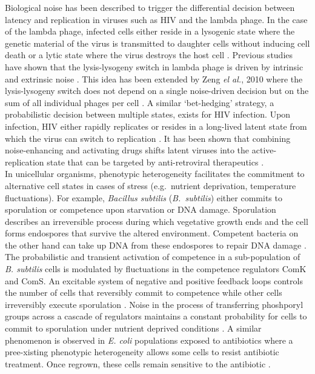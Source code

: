 Biological noise has been described to trigger the differential decision between latency and replication in viruses such as HIV and the lambda phage. In the case of the lambda phage, infected cells either reside in a lysogenic state where the genetic material of the virus is transmitted to daughter cells without inducing cell death or a lytic state where the virus destroys the host cell \citep{Lieb1953}. Previous studies have shown that the lysis-lysogeny switch in lambda phage is driven by intrinsic and extrinsic noise \citep{Arkin1998, St-Pierre2008}. This idea has been extended by Zeng \textit{el al.}, 2010 where the lysis-lysogeny switch does not depend on a single noise-driven decision but on the sum of all individual phages per cell \citep{Zeng2010}. A similar ‘bet-hedging’ strategy, a probabilistic decision between multiple states, exists for HIV infection. Upon infection, HIV either rapidly replicates or resides in a long-lived latent state from which the virus can switch to replication \citep{Weinberger2015}. It has been shown that combining noise-enhancing and activating drugs shifts latent viruses into the active-replication state that can be targeted by anti-retroviral therapeutics \citep{Dar2014}. \\

In unicellular organisms, phenotypic heterogeneity facilitates the commitment to alternative cell states in cases of stress (e.g.~nutrient deprivation, temperature fluctuations). For example, \textit{Bacillus subtilis} (\emph{B.~subtilis}) either commits to sporulation or competence upon starvation or DNA damage. Sporulation describes an irreversible process during which vegetative growth ends and the cell forms endospores that survive the altered environment. Competent bacteria on the other hand can take up DNA from these endospores to repair DNA damage \citep{Schultz2009}. The probabilistic and transient activation of competence in a sub-population of \textit{B. subtilis} cells is modulated by fluctuations in the competence regulators ComK and ComS. An excitable system of negative and positive feedback loops controls the number of cells that reversibly commit to competence while other cells irreversibly execute sporulation \citep{Suel2006}. Noise in the process of transferring phoshporyl groups across a cascade of regulators maintains a constant probability for cells to commit to sporulation under nutrient deprived conditions \citep{Russell2017}. A similar phenomenon is observed in \textit{E. coli} populations exposed to antibiotics where a pree-xisting phenotypic heterogeneity allows some cells to resist antibiotic treatment. Once regrown, these cells remain sensitive to the antibiotic \citep{Balaban2004}. \\

